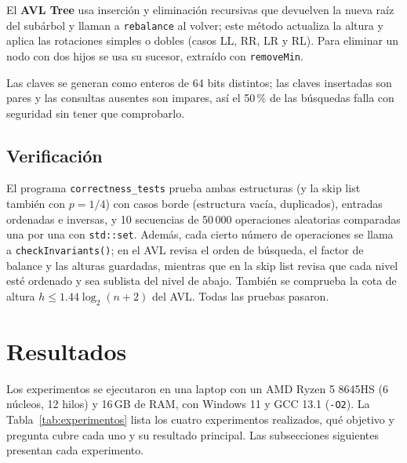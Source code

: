 \documentclass[11pt,a4paper]{article}
\begin{document}
El \textbf{AVL Tree} usa inserción y eliminación recursivas que devuelven la
nueva raíz del subárbol y llaman a \texttt{rebalance} al volver; este método
actualiza la altura y aplica las rotaciones simples o dobles (casos LL, RR, LR
y RL). Para eliminar un nodo con dos hijos se usa su sucesor, extraído con
\texttt{removeMin}.

Las claves se generan como enteros de 64 bits distintos; las claves
insertadas son pares y las consultas ausentes son impares, así el 50\,\% de
las búsquedas falla con seguridad sin tener que comprobarlo.

\subsection{Verificación}

El programa \texttt{correctness\_tests} prueba ambas estructuras (y la skip
list también con $p = 1/4$) con casos borde (estructura vacía, duplicados),
entradas ordenadas e inversas, y 10 secuencias de 50\,000 operaciones
aleatorias comparadas una por una con \texttt{std::set}. Además, cada cierto
número de operaciones se llama a \texttt{checkInvariants()}; en el AVL revisa
el orden de búsqueda, el factor de balance y las alturas guardadas, mientras que
en la skip list revisa que cada nivel esté ordenado y sea sublista del nivel de
abajo. También se comprueba la cota de altura
$h \le 1.44 \log_2(n+2)$ del AVL. Todas las pruebas pasaron.

\section{Resultados}\label{sec:resultados}

Los experimentos se ejecutaron en una laptop con un AMD Ryzen 5 8645HS (6
núcleos, 12 hilos) y 16\,GB de RAM, con Windows 11 y GCC 13.1 (\texttt{-O2}).
La Tabla~\ref{tab:experimentos} lista los cuatro experimentos realizados, qué
objetivo y pregunta cubre cada uno y su resultado principal. Las subsecciones
siguientes presentan cada experimento.
\end{document}
